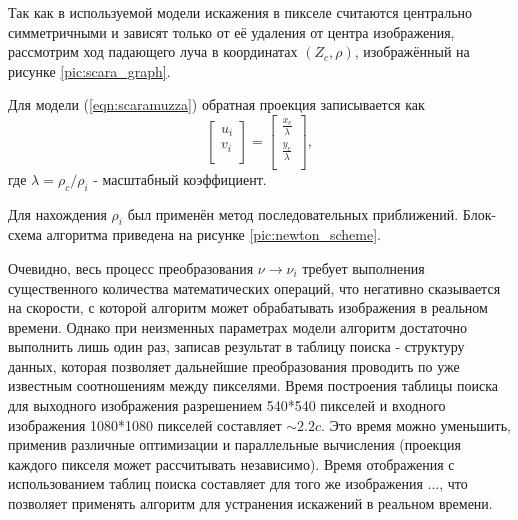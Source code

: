 Так как в используемой модели искажения в пикселе считаются центрально симметричными и зависят только от её удаления от центра изображения, 
рассмотрим ход падающего луча в координатах $(Z_c, \rho)$, изображённый на рисунке \ref{pic:scara_graph}.


Для модели (\ref{eqn:scaramuzza}) обратная проекция записывается как 
\begin{equation}
    \label{eq:back_scara}
    \left[\begin{matrix}u_i\\v_i\\\end{matrix}\right] = \left[\begin{matrix} \frac{x_c}{\lambda}  \\  \frac{y_c}{\lambda} \\\end{matrix}\right],
\end{equation}  
где $\lambda = \rho_c / \rho_i$ - масштабный коэффициент. 

Для нахождения $\rho_i$ был применён метод последовательных приближений. Блок-схема алгоритма приведена на рисунке \ref{pic:newton_scheme}.


Очевидно, весь процесс преобразования $\nu \rightarrow \nu_i$ требует выполнения существенного количества математических операций, что 
негативно сказывается на скорости, с которой алгоритм может обрабатывать изображения в реальном времени. Однако при неизменных параметрах 
модели алгоритм достаточно выполнить лишь один раз, записав результат в таблицу поиска - структуру данных, которая позволяет дальнейшие 
преобразования проводить по уже известным соотношениям между пикселями. Время построения таблицы поиска для выходного изображения 
разрешением 540*540 пикселей и входного изображения 1080*1080 пикселей составляет $\sim 2.2c$. %
Это время можно уменьшить, применив различные оптимизации и параллельные вычисления (проекция каждого пикселя может рассчитывать независимо). %
Время отображения с использованием таблиц поиска составляет для того же изображения $ ... $, что позволяет применять алгоритм для устранения 
искажений в реальном времени.